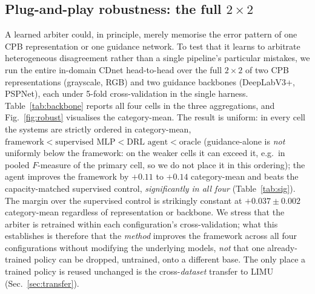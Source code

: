 \documentclass[sn-basic]{sn-jnl}
\newcommand{\Fm}{$F$-measure}
\begin{document}
\subsection{Plug-and-play robustness: the full $2\times2$}
\label{sec:backbone}
A learned arbiter could, in principle, merely memorise the error pattern of one
CPB representation or one guidance network. To test that it learns to arbitrate
heterogeneous disagreement rather than a single pipeline's particular mistakes, we run
the entire in-domain CDnet head-to-head over the full $2\times2$ of two CPB
representations (grayscale, RGB) and two guidance backbones (DeepLabV3+, PSPNet), each
under 5-fold cross-validation in the single harness. Table~\ref{tab:backbone} reports
all four cells in the three aggregations, and Fig.~\ref{fig:robust} visualises the
category-mean. The result is uniform: in every cell the systems are strictly ordered in
category-mean, $\text{framework}<\text{supervised MLP}<\text{DRL agent}<\text{oracle}$
(guidance-alone is \emph{not} uniformly below the framework: on the weaker cells it can
exceed it, e.g.\ in pooled \Fm{} of the primary cell, so we do not place it in this
ordering); the agent improves the framework by $+0.11$ to $+0.14$ category-mean and
beats the capacity-matched supervised control, \emph{significantly in all four}
(Table~\ref{tab:sig}). The margin over the supervised control is strikingly constant at
$+0.037\pm0.002$ category-mean regardless of representation or backbone. We stress that
the arbiter is retrained within each configuration's cross-validation; what this
establishes is therefore that the \emph{method} improves the framework across all four
configurations without modifying the underlying models, \emph{not} that one
already-trained policy can be dropped, untrained, onto a different base. The only place a
trained policy is reused unchanged is the cross-\emph{dataset} transfer to LIMU
(Sec.~\ref{sec:transfer}).
\end{document}
